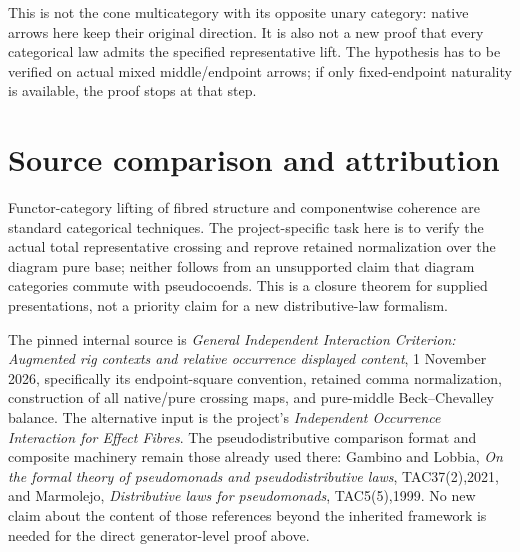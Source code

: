 \documentclass[11pt]{article}
\begin{document}
This is not the cone multicategory with its opposite unary category: native arrows here keep their original direction. It is also not a new proof that every categorical law admits the specified representative lift. The hypothesis has to be verified on actual mixed middle/endpoint arrows; if only fixed-endpoint naturality is available, the proof stops at that step.
\section{Source comparison and attribution}
Functor-category lifting of fibred structure and componentwise coherence are standard categorical techniques. The project-specific task here is to verify the actual total representative crossing and reprove retained normalization over the diagram pure base; neither follows from an unsupported claim that diagram categories commute with pseudocoends. This is a closure theorem for supplied presentations, not a priority claim for a new distributive-law formalism.

The pinned internal source is \emph{General Independent Interaction Criterion: Augmented rig contexts and relative occurrence displayed content}, 1 November 2026, specifically its endpoint-square convention, retained comma normalization, construction of all native/pure crossing maps, and pure-middle Beck--Chevalley balance. The alternative input is the project's \emph{Independent Occurrence Interaction for Effect Fibres}. The pseudodistributive comparison format and composite machinery remain those already used there: Gambino and Lobbia, \emph{On the formal theory of pseudomonads and pseudodistributive laws}, TAC37(2),2021, and Marmolejo, \emph{Distributive laws for pseudomonads}, TAC5(5),1999. No new claim about the content of those references beyond the inherited framework is needed for the direct generator-level proof above.
\end{document}
